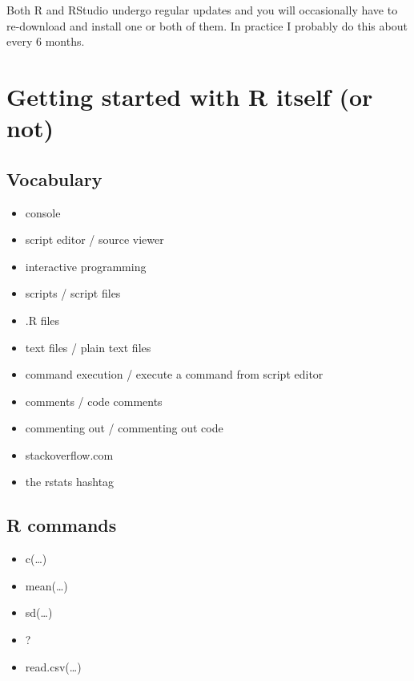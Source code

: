 \documentclass[
]{book}
\providecommand{\tightlist}{%
  \setlength{\itemsep}{0pt}\setlength{\parskip}{0pt}}
\begin{document}
Both R and RStudio undergo regular updates and you will occasionally have to re-download and install one or both of them. In practice I probably do this about every 6 months.

\hypertarget{getting-started-with-r-itself-or-not}{%
\chapter*{Getting started with R itself (or not)}\label{getting-started-with-r-itself-or-not}}

\hypertarget{vocabulary-2}{%
\section*{Vocabulary}\label{vocabulary-2}}

\begin{itemize}
\tightlist
\item
  console
\item
  script editor / source viewer
\item
  interactive programming
\item
  scripts / script files
\item
  .R files
\item
  text files / plain text files
\item
  command execution / execute a command from script editor
\item
  comments / code comments
\item
  commenting out / commenting out code
\item
  stackoverflow.com
\item
  the rstats hashtag
\end{itemize}

\hypertarget{r-commands}{%
\section*{R commands}\label{r-commands}}

\begin{itemize}
\tightlist
\item
  c(\ldots)
\item
  mean(\ldots)
\item
  sd(\ldots)
\item
  ?
\item
  read.csv(\ldots)
\end{itemize}
\end{document}
